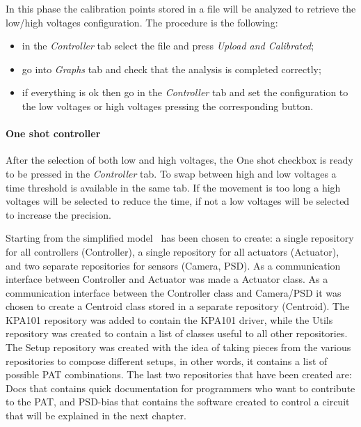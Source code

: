 In this phase the calibration points stored in a
file will be analyzed to retrieve the low/high voltages configuration. The procedure is the following:

\begin{itemize}
      \itemsep1pt\parskip0pt
      \item
            in the \emph{Controller} tab select the file and press \emph{Upload
                  and Calibrated};
      \item
            go into \emph{Graphs} tab and check that the analysis is completed
            correctly;
      \item
            if everything is ok then go in the \emph{Controller} tab and set the
            configuration to the low voltages or high voltages pressing the
            corresponding button.
\end{itemize}


\paragraph{One shot controller}

After the selection of both low and high voltages, the One shot checkbox is ready to be pressed in the \emph{Controller} tab. To
swap between high and low voltages a time threshold is available in the same tab. If the movement is too long a high voltages will be selected to reduce the time, if not a low voltages will be selected to increase the precision.

Starting from the simplified model~ has been chosen to create: a single repository for all controllers (Controller), a single repository for all actuators (Actuator), and two separate repositories for sensors (Camera, PSD).
As a communication interface between Controller and Actuator was made a Actuator class. As a communication interface between the Controller class and Camera/PSD it was chosen to create a Centroid class stored in a separate repository (Centroid).
The KPA101 repository was added to contain the KPA101 driver, while the Utils repository was created to contain a list of classes useful to all other repositories.
The Setup repository was created with the idea of taking pieces from the various repositories to compose different setups, in other words, it contains a list of possible PAT combinations.
The last two repositories that have been created are: Docs that contains quick documentation for programmers who want to contribute to the PAT, and PSD-bias that contains the software created to control a circuit that will be explained in the next chapter.

